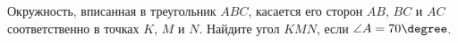 \begin{ex}
	\begin{condition}
		Окружность, вписанная в треугольник \( ABC \), касается его сторон \( AB \), \( BC  \) и \( AC  \) соответственно в точках \( K \), \( M  \) и \( N  \). Найдите угол \( KMN  \), если \( \angle A = 70\degree \).
	\end{condition}
\end{ex}